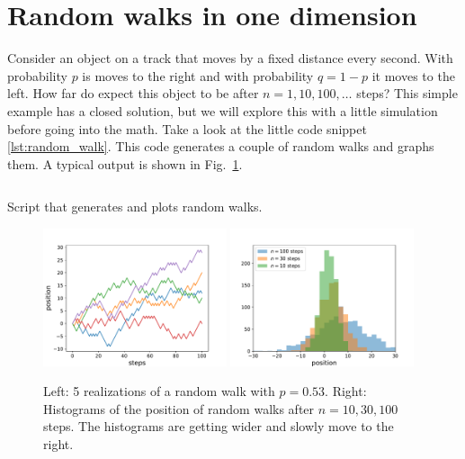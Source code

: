 \section{Random walks in one dimension}
Consider an object on a track that moves by a fixed distance every second.
With probability $p$ is moves to the right and with probability $q=1-p$ it moves to the left.
How far do expect this object to be after $n=1,10,100,\dots$ steps?
This simple example has a closed solution, but we will explore this with a little simulation before going into the math.
Take a look at the little code snippet \ref{lst:random_walk}.
This code generates a couple of random walks and graphs them.
A typical output is shown in Fig.~\ref{fig:RW}.

\begin{listing}[h]
\inputminted{python}{scripts/random_walk.py}
\caption{Script that generates and plots random walks.}
\label{lst:random_walk}
\end{listing}

\begin{figure}[tb]
	\centering
	\includegraphics[width=0.48\textwidth]{figures/random_walk.pdf}
	\includegraphics[width=0.48\textwidth]{figures/random_walk_histogram.pdf}
	\caption{Left: 5 realizations of a random walk with $p=0.53$. Right: Histograms of the position of random walks after $n=10, 30, 100$ steps. The histograms are getting wider and slowly move to the right. }
	\label{fig:RW}
\end{figure}

